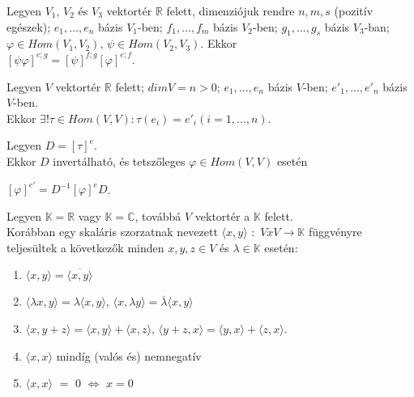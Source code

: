 \begin{frame}
		\begin{tcolorbox}[title={Tétel: Szorzástétel}]
 			Legyen $V_1$, $V_2$ és $V_3$ vektortér $\mathbb{R}$ felett, dimenziójuk rendre $n, m, s$ (pozitív egészek); $e_1, ..., e_n$ bázis $V_1$-ben; $f_1, ..., f_m$ bázis $V_2$-ben; $g_1, ..., g_s$ bázis $V_3$-ban; $\varphi \in Hom(V_1, V_2)$, $\psi \in Hom(V_2, V_3)$. Ekkor\\
 			
			$[{\psi}{\varphi}]^{e;g} = [{\psi}]^{f ;g}[{\varphi}]^{e;f}$.
		\end{tcolorbox}	

	\end{frame}
	
	\begin{frame}
		\begin{tcolorbox}[title={Tétel: Új bázisba való áttérés}]
 			Legyen $V$ vektortér $\mathbb{R}$ felett; $dim V = n > 0$; $e_1, ..., e_n$ bázis $V$-ben; $e'_1, ..., e'_n$ bázis $V$-ben.\\
 			Ekkor ${\exists}!{\tau} \in Hom(V, V) : {\tau}(e_i) = e'_i (i = 1, ..., n)$.\\
 			\mmedskip
 			
 			Legyen $D = [{\tau}]^e$.\\
 			Ekkor $D$ invertálható, és tetszőleges $\varphi \in Hom(V, V )$ esetén\\
 			\mmedskip
 			
			$[{\varphi}]^{e'} = D^{-1}[{\varphi}]^eD$.
		\end{tcolorbox}	
		
		\begin{tcolorbox}[title={Tétel: Skaláris szorzat}]
			Legyen $\mathbb{K} = \mathbb{R}$ vagy $\mathbb{K} = \mathbb{C}$, továbbá $V$ vektortér a $\mathbb{K}$ felett.\\
			Korábban egy skaláris szorzatnak nevezett ${\langle}x, y{\rangle}$ $:$ $V x V \rightarrow \mathbb{K}$ függvényre teljesültek a következők minden $x, y, z \in V$ és $\lambda \in \mathbb{K}$ esetén:\\

 			  \begin{enumerate}
 			 \item ${\langle}x, y{\rangle} = \overline{{\langle}x, y{\rangle}}$
 			 \item ${\langle}{\lambda}x, y{\rangle} = {\lambda}{\langle}x, y{\rangle}$, ${\langle}x, {\lambda}y{\rangle} = \overline{{\lambda}}{\langle}x, y{\rangle}$
			 \item ${\langle}x, y + z{\rangle} = {\langle}x, y{\rangle} + {\langle}x, z{\rangle}$, ${\langle}y + z, x{\rangle} = {\langle}y, x{\rangle} + {\langle}z, x{\rangle}$.
			 \item ${\langle}x, x{\rangle}$ mindíg (valós és) nemnegatív
			 \item ${\langle}x, x{\rangle}$ $=$ $0$ $\iff$ $x = 0$
 			 \end{enumerate}	
 		\end{tcolorbox}	
		

\end{frame}
